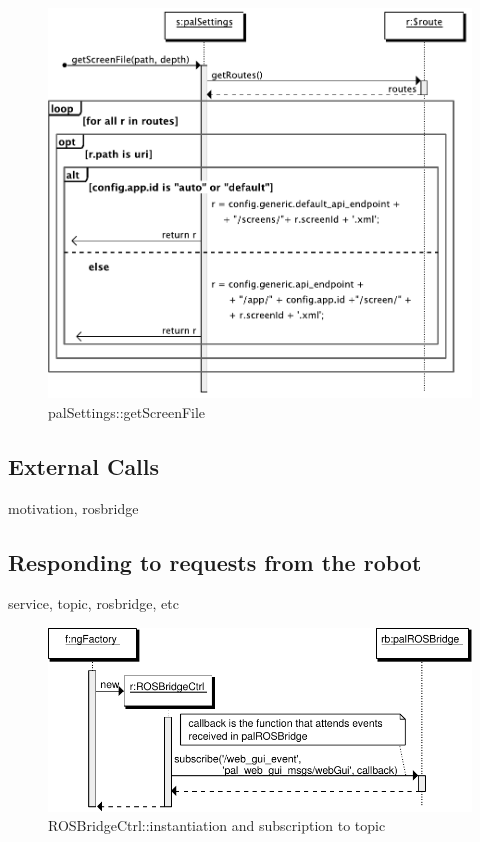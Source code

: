 \begin{figure}[htb]
    \centering
    \includegraphics{figures/design/seqdia/palSettings-getScreenFile.pdf}
    \caption{palSettings::getScreenFile}
    \label{fig:design-seqdia-palsettings-getscreenfile}
\end{figure}



\FloatBarrier

\subsection{External Calls}
motivation, rosbridge

\subsection{Responding to requests from the robot}
service, topic, rosbridge, etc

\begin{figure}[htb]
    \centering
    \includegraphics{figures/design/seqdia/ROSBridgeCtrl-creation.pdf}
    \caption{ROSBridgeCtrl::instantiation and subscription to topic}
    \label{fig:design-seqdia-ROSBridgeCtrl-creation}
\end{figure}

